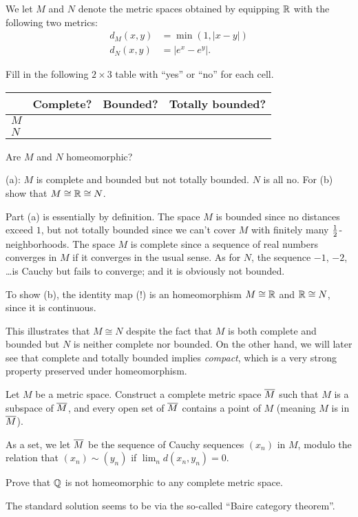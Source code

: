 \begin{problem}
	We let $M$ and $N$ denote the metric spaces obtained
	by equipping $\mathbb R$ with the following two metrics:
	\begin{align*}
		d_M(x,y) &= \min \left( 1, \left\lvert x-y \right\rvert \right) \\
		d_N(x,y) &= \left\lvert e^x - e^y \right\rvert.
	\end{align*}
	\begin{enumerate}[(a)]
		\ii Fill in the following $2 \times 3$ table
		with ``yes'' or ``no'' for each cell.
		\begin{center}
		\begin{tabular}[h]{l|ccc}
			& Complete? & Bounded? & Totally bounded? \\ \hline
			$M$ \\
			$N$ \\
		\end{tabular}
		\end{center}
		\ii Are $M$ and $N$ homeomorphic?
	\end{enumerate}
	\begin{hint}
		(a): $M$ is complete and bounded
		but not totally bounded. $N$ is all no.
		For (b) show that $M \cong \mathbb R \cong N$.
	\end{hint}
	\begin{sol}
		Part (a) is essentially by definition.
		The space $M$ is bounded since no distances exceed $1$,
		but not totally bounded since we can't cover $M$
		with finitely many $\frac{1}{2}$-neighborhoods.
		The space $M$ is complete since a sequence of real
		numbers converges in $M$ if it converges in the usual sense.
		As for $N$, the sequence $-1$, $-2$, \dots is Cauchy
		but fails to converge; and it is obviously not bounded.

		To show (b), the identity map (!) is an homeomorphism $M \cong \mathbb R$
		and $\mathbb R \cong N$, since it is continuous.

		This illustrates that $M \cong N$ despite the fact
		that $M$ is both complete and bounded
		but $N$ is neither complete nor bounded.
		On the other hand, we will later see that complete
		and totally bounded implies \emph{compact},
		which is a very strong property preserved under homeomorphism.
	\end{sol}
\end{problem}


\begin{dproblem}
	\yod
	\label{prob:completion}
	Let $M$ be a metric space.
	Construct a complete metric space $\overline M$
	such that $M$ is a subspace of $\overline M$,
	and every open set of $\overline M$ contains a point of $M$
	(meaning $M$ is  in $\overline M$).
	\begin{hint}
		As a set, we let $\overline M$ be the sequence of Cauchy
		sequences $(x_n)$ in $M$, modulo the relation that
		$(x_n) \sim (y_n)$ if $\lim_n d(x_n, y_n) = 0$.
	\end{hint}
\end{dproblem}

\begin{problem}
	\kurumi
	Prove that $\mathbb Q$ is not homeomorphic to any complete metric space.
	\begin{hint}
		The standard solution seems to be
		via the so-called ``Baire category theorem''.
	\end{hint}
\end{problem}
